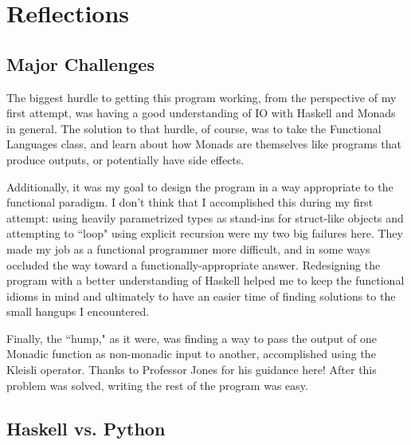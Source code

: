 \documentclass[12pt,a4paper]{article}
\begin{document}
	\section{Reflections}
	
		\subsection{Major Challenges}
		
		\par The biggest hurdle to getting this program working, from the perspective of my first attempt, was having a good understanding of IO with Haskell and Monads in general. The solution to that hurdle, of course, was to take the Functional Languages class, and learn about how Monads are themselves like programs that produce outputs, or potentially have side effects. 
		\par Additionally, it was my goal to design the program in a way appropriate to the functional paradigm. I don't think that I accomplished this during my first attempt: using heavily parametrized types as stand-ins for struct-like objects and attempting to ``loop" using explicit recursion were my two big failures here. They made my job as a functional programmer more difficult, and in some ways occluded the way toward a functionally-appropriate answer. Redesigning the program with a better understanding of Haskell helped me to keep the functional idioms in mind and ultimately to have an easier time of finding solutions to the small hangups I encountered.
		\par Finally, the ``hump," as it were, was finding a way to pass the output of one Monadic function as non-monadic input to another, accomplished using the Kleisli operator. Thanks to Professor Jones for his guidance here! After this problem was solved, writing the rest of the program was easy.
		
		\subsection{Haskell vs. Python}
		
\end{document}
